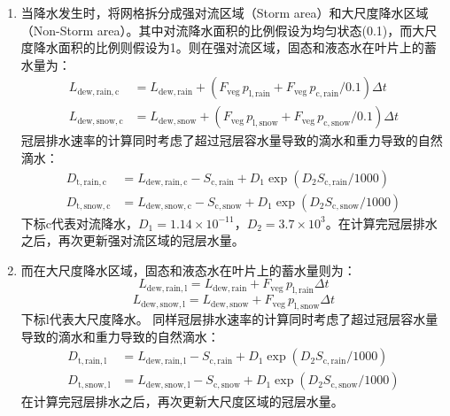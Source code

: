 \begin{enumerate}
  \item 当降水发生时，将网格拆分成强对流区域（Storm area）和大尺度降水区域（Non-Storm area）。其中对流降水面积的比例假设为均匀状态(0.1)，而大尺度降水面积的比例则假设为1。则在强对流区域，固态和液态水在叶片上的蓄水量为：
    \begin{align}
      L_{\mathrm{dew,rain,c}} &= L_{\mathrm{dew,rain}}+\left(F_{\mathrm{veg}}\,p_{\mathrm{l,rain}} + F_{\mathrm{veg}}\,p_{\mathrm{c,rain}}/0.1\right)\Delta t \\[2.2ex]
      L_{\mathrm{dew,snow,c}} &= L_{\mathrm{dew,snow}}+\left(F_{\mathrm{veg}}\,p_{\mathrm{l,snow}} + F_{\mathrm{veg}}\,p_{\mathrm{c,snow}}/0.1\right)\Delta t
    \end{align}
    冠层排水速率的计算同时考虑了超过冠层容水量导致的滴水和重力导致的自然滴水：
    \begin{align}
      D_{\mathrm{t,rain,c}} &= L_{\mathrm{dew,rain,c}} -S_{\mathrm{c,rain}} + D_{1} \exp\left(D_{2} S_{\mathrm{c,rain}}/1000\right) \\[2.2ex]
      D_{\mathrm{t,snow,c}} &= L_{\mathrm{dew,snow,c}} - S_{\mathrm{c,snow}} + D_{1} \exp\left(D_{2} S_{\mathrm{c,snow}}/1000\right)
    \end{align}
    下标${\mathrm{c}}$代表对流降水，$D_{1}=1.14 \times 10^{-11}$，$D_{2}=3.7 \times 10^{3}$。在计算完冠层排水之后，再次更新强对流区域的冠层水量。

  \item 而在大尺度降水区域，固态和液态水在叶片上的蓄水量则为：
    \begin{equation}
      L_\mathrm{dew,rain,l} = L_\mathrm{dew,rain} + F_\mathrm{veg}\,p_\mathrm{l,rain} \Delta t
    \end{equation}
    \begin{equation}
      L_\mathrm{dew,snow,l} = L_\mathrm{dew,snow} + F_\mathrm{veg}\,p_\mathrm{l,snow} \Delta t
    \end{equation}
    下标${\mathrm {l}}$代表大尺度降水。
    同样冠层排水速率的计算同时考虑了超过冠层容水量导致的滴水和重力导致的自然滴水：
      \begin{align}
      D_{\mathrm{t,rain,l}} &=L_{\mathrm{dew,rain,l}}-S_{\mathrm{c,rain}}+D_{1} \exp \left(D_{2} S_{\mathrm{c,rain}}/1000\right) \\[2.2ex]
      D_{\mathrm{t,snow,l}} &=L_{\mathrm{dew,snow,l}}-S_{\mathrm{c,snow}}+D_{1} \exp \left(D_{2} S_{\mathrm{c,snow}}/1000\right)
      \end{align}
    在计算完冠层排水之后，再次更新大尺度区域的冠层水量。


\end{enumerate}
